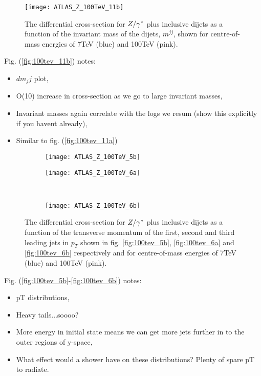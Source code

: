 	\begin{figure}[h]
		\centering
		\texttt{[image: ATLAS\_Z\_100TeV\_11b]}
		\caption{The differential cross-section for $Z/\gamma^*$ plus inclusive dijets as a function of the invariant mass
		         of the dijets, $m^{jj}$, shown for centre-of-mass energies of 7TeV (blue) and 100TeV (pink).}
		\label{fig:100tev_11b}
	\end{figure}

	Fig. (\eqref{fig:100tev_11b}) notes:

	\begin{itemize}
		\item $dm_jj$ plot,
		\item O(10) increase in cross-section as we go to large invariant masses,
		\item Invariant masses again correlate with the logs we resum (show this explicitly if you havent already),
		\item Similar to fig. (\eqref{fig:100tev_11a})
	\end{itemize}

	\begin{figure}[h]
		\centering
		\begin{subfigure}[b]{0.48\textwidth}
			\texttt{[image: ATLAS\_Z\_100TeV\_5b]}
			\caption{}
			\label{fig:100tev_5b}
		\end{subfigure}

		\begin{subfigure}[b]{0.48\textwidth}
			\texttt{[image: ATLAS\_Z\_100TeV\_6a]}
			\caption{}
			\label{fig:100tev_6a}
		\end{subfigure}
		~
		\begin{subfigure}[b]{0.48\textwidth}
			\texttt{[image: ATLAS\_Z\_100TeV\_6b]}
			\caption{}
			\label{fig:100tev_6b}
		\end{subfigure}
		\caption{The differential cross-section for $Z/\gamma^*$ plus inclusive dijets as a function of the transverse momentum
		         of the first, second and third leading jets in $p_T$ shown in fig. \eqref{fig:100tev_5b}, \eqref{fig:100tev_6a}
		         and \eqref{fig:100tev_6b} respectively and for centre-of-mass energies of 7TeV (blue) and 100TeV (pink).}
	\end{figure}

	Fig. (\eqref{fig:100tev_5b}-\eqref{fig:100tev_6b}) notes:

	\begin{itemize}
		\item pT distributions,
		\item Heavy tails...soooo?
		\item More energy in initial state means we can get more jets further in to the outer regions of y-space,
		\item What effect would a shower have on these distributions?  Plenty of spare pT to radiate.
	\end{itemize}

